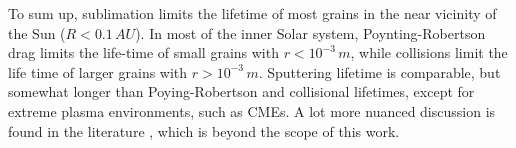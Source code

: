 To sum up, sublimation limits the lifetime of most grains in the near vicinity of the Sun ($R<0.1 \, \si{AU}$). In most of the inner Solar system, Poynting-Robertson drag limits the life-time of small grains with $r<10^{-3} \, \si{m}$, while collisions limit the life time of larger grains with $r>10^{-3} \, \si{m}$. Sputtering lifetime is comparable, but somewhat longer than Poying-Robertson and collisional lifetimes, except for extreme plasma environments, such as CMEs. A lot more nuanced discussion is found in the literature \citep{klepper2021influence,baumann2020dust,grun1985collisional,whipple1967maintaining,myrvang2018temperature}, which is beyond the scope of this work.  